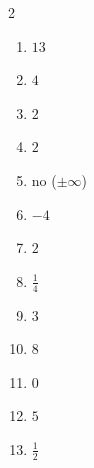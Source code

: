 \documentclass[11pt]{article}
\begin{document}
\begin{keybox}
\begin{multicols}{2}
\small
\begin{enumerate}[leftmargin=*,itemsep=3pt]
  \item $13$
  \item $4$
  \item $2$
  \item $2$
  \item no ($\pm\infty$)
  \item $-4$
  \item $2$
  \item $\tfrac14$
  \item $3$
  \item $8$
  \item $0$
  \item $5$
  \item $\tfrac12$
\end{enumerate}
\end{multicols}
\end{keybox}
\end{document}
